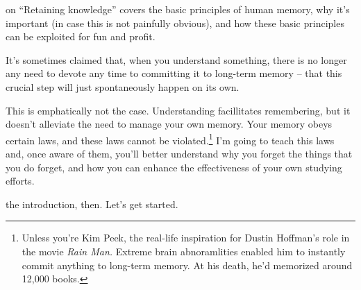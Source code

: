  on ``Retaining knowledge'' covers the basic
principles of human memory, why it's important (in case this is not painfully
obvious), and how these basic principles can be exploited for fun and profit.

It's sometimes claimed that, when you understand something, there is no longer
any need to devote any time to committing it to long-term memory -- that this
crucial step will just spontaneously happen on its own.

This is emphatically not the case. Understanding facillitates remembering, but
it doesn't alleviate the need to manage your own memory. Your memory obeys
certain laws, and these laws cannot be violated.\footnote{Unless you're Kim
  Peek, the real-life inspiration for Dustin Hoffman's role in the movie \textit{Rain Man.} Extreme brain abnoramlities enabled him to instantly commit
  anything to long-term memory. At his death, he'd memorized around 12,000 books.} I'm going to teach this laws and, once aware of
them, you'll better understand why you forget the things that you do forget, and
how you can enhance the effectiveness of your own studying efforts.

 the introduction, then. Let's get started.
